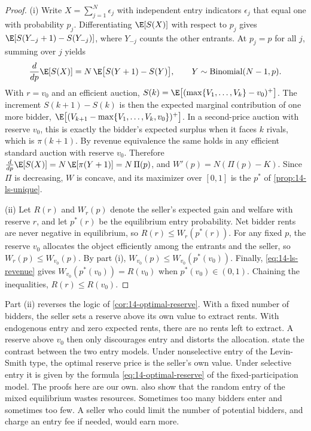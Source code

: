\begin{proof}
(i) Write $X=\sum_{j=1}^{N}\epsilon_j$ with independent entry indicators $\epsilon_j$ that equal one
with probability $p_j$. Differentiating $\E[S(X)]$ with respect to $p_j$ gives
$\E[S(Y_{-j}+1)-S(Y_{-j})]$, where $Y_{-j}$ counts the other entrants. At $p_j=p$ for all $j$,
summing over $j$ yields
\[
\frac{d}{dp}\E[S(X)]=N\,\E\bigl[S(Y+1)-S(Y)\bigr],\qquad Y\sim\text{Binomial}(N-1,p).
\]
With $r=v_0$ and an efficient auction, $S(k)=\E\bigl[(\max\{V_1,\dots,V_k\}-v_0)^+\bigr]$. The
increment $S(k+1)-S(k)$ is then the expected marginal contribution of one more bidder,
$\E\bigl[(V_{k+1}-\max\{V_1,\dots,V_k,v_0\})^+\bigr]$. In a second-price auction with reserve $v_0$,
this is exactly the bidder's expected surplus when it faces $k$ rivals, which is $\pi(k+1)$. By
revenue equivalence the same holds in any efficient standard auction with reserve $v_0$. Therefore
$\frac{d}{dp}\E[S(X)]=N\,\E[\pi(Y+1)]=N\,\Pi(p)$, and $W'(p)=N(\Pi(p)-K)$. Since $\Pi$ is decreasing,
$W$ is concave, and its maximizer over $[0,1]$ is the $p^*$ of \cref{prop:14-ls-unique}.

(ii) Let $R(r)$ and $W_r(p)$ denote the seller's expected gain and welfare with reserve $r$, and let
$p^*(r)$ be the equilibrium entry probability. Net bidder rents are never negative in equilibrium, so $R(r)\le
W_r(p^*(r))$. For any fixed $p$, the reserve $v_0$ allocates the object efficiently among the
entrants and the seller, so $W_r(p)\le W_{v_0}(p)$. By part (i), $W_{v_0}(p)\le W_{v_0}(p^*(v_0))$.
Finally, \eqref{eq:14-ls-revenue} gives $W_{v_0}(p^*(v_0))=R(v_0)$ when $p^*(v_0)\in(0,1)$. Chaining
the inequalities, $R(r)\le R(v_0)$.
\end{proof}

Part (ii) reverses the logic of \cref{cor:14-optimal-reserve}. With a fixed number of bidders, the
seller sets a reserve above its own value to extract rents. With endogenous entry and zero expected
rents, there are no rents left to extract. A reserve above $v_0$ then only discourages entry and
distorts the allocation. \citet[Section~2.2, p.~91]{HortacsuPerrigne2021} state the contrast between
the two entry models. Under nonselective entry of the Levin-Smith type, the optimal reserve price is
the seller's own value. Under selective entry it is given by the formula \eqref{eq:14-optimal-reserve}
of the fixed-participation model. The proofs here are our own.
\citet{LevinSmith1994} also show that the random entry of the mixed
equilibrium wastes resources. Sometimes too many bidders enter and sometimes too few. A seller who
could limit the number of potential bidders, and charge an entry fee if needed, would earn more.

